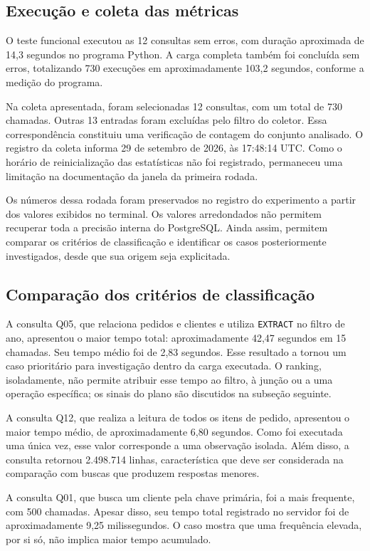 \documentclass{UNESC}
\begin{document}
\subsection{Execução e coleta das métricas}

O teste funcional executou as 12 consultas sem erros, com duração aproximada de 14,3 segundos no programa Python. A carga completa também foi concluída sem erros, totalizando 730 execuções em aproximadamente 103,2 segundos, conforme a medição do programa.

Na coleta apresentada, foram selecionadas 12 consultas, com um total de 730 chamadas. Outras 13 entradas foram excluídas pelo filtro do coletor. Essa correspondência constituiu uma verificação de contagem do conjunto analisado. O registro da coleta informa 29 de setembro de 2026, às 17:48:14 UTC. Como o horário de reinicialização das estatísticas não foi registrado, permaneceu uma limitação na documentação da janela da primeira rodada.

Os números dessa rodada foram preservados no registro do experimento a partir dos valores exibidos no terminal. Os valores arredondados não permitem recuperar toda a precisão interna do PostgreSQL. Ainda assim, permitem comparar os critérios de classificação e identificar os casos posteriormente investigados, desde que sua origem seja explicitada.

\subsection{Comparação dos critérios de classificação}

A consulta Q05, que relaciona pedidos e clientes e utiliza \texttt{EXTRACT} no filtro de ano, apresentou o maior tempo total: aproximadamente 42,47 segundos em 15 chamadas. Seu tempo médio foi de 2,83 segundos. Esse resultado a tornou um caso prioritário para investigação dentro da carga executada. O ranking, isoladamente, não permite atribuir esse tempo ao filtro, à junção ou a uma operação específica; os sinais do plano são discutidos na subseção seguinte.

A consulta Q12, que realiza a leitura de todos os itens de pedido, apresentou o maior tempo médio, de aproximadamente 6,80 segundos. Como foi executada uma única vez, esse valor corresponde a uma observação isolada. Além disso, a consulta retornou 2.498.714 linhas, característica que deve ser considerada na comparação com buscas que produzem respostas menores.

A consulta Q01, que busca um cliente pela chave primária, foi a mais frequente, com 500 chamadas. Apesar disso, seu tempo total registrado no servidor foi de aproximadamente 9,25 milissegundos. O caso mostra que uma frequência elevada, por si só, não implica maior tempo acumulado.
\end{document}
